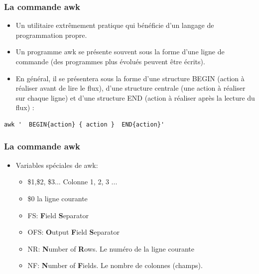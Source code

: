 \documentclass[10pt, xcolor=dvipsnames]{beamer}
\begin{document}
\begin{frame}[fragile]
  \frametitle{La commande awk}

  \begin{itemize}
  \item Un utilitaire extrêmement pratique qui bénéficie d'un langage de programmation propre. 
  \item Un programme awk se présente souvent sous la forme d'une ligne de commande (des programmes plus évolués peuvent être écrits). 
  \item En général, il se présentera sous la forme d'une structure BEGIN (action à réaliser avant de lire le flux), d'une structure centrale (une action à réaliser sur chaque ligne) et d'une structure END (action à réaliser après la lecture du flux) :
  \end{itemize}

\begin{verbatim}
awk '  BEGIN{action} { action }  END{action}' 
\end{verbatim}

\end{frame}


\begin{frame}[fragile]
  \frametitle{La commande awk}

  \begin{itemize}
  \item Variables spéciales de awk:
	\begin{itemize}
	\item \$1,\$2, \$3... Colonne 1, 2, 3 ...
	\item \$0 la ligne courante
	\item FS: \textbf{F}ield \textbf{S}eparator
	\item OFS: \textbf{O}utput \textbf{F}ield \textbf{S}eparator
	\item NR: \textbf{N}umber of \textbf{R}ows. Le numéro de la ligne courante
	\item NF: \textbf{N}umber of \textbf{F}ields. Le nombre de colonnes (champs).
    \end{itemize}
  \end{itemize}

  
\end{frame}
\end{document}
